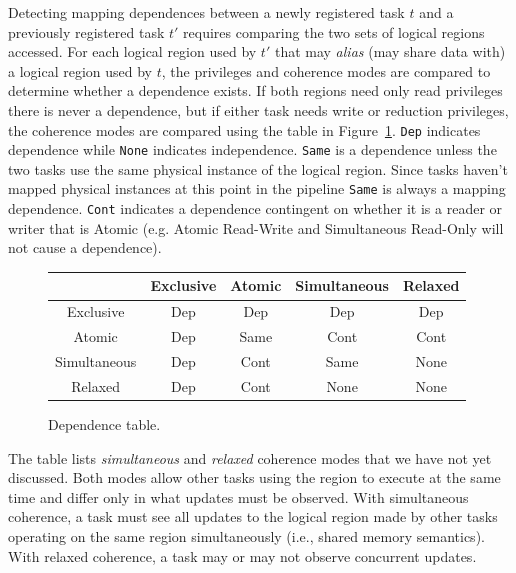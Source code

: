 Detecting mapping dependences between a newly registered task $t$ and
a previously registered task $t'$ requires comparing the two sets of
logical regions accessed.  For each logical region used by $t'$ that
may {\em alias} (may share data with) a logical region used by $t$, the privileges and
coherence modes are compared to determine whether a dependence exists.
If both regions need only read privileges there is never a dependence,
but if either task needs write or reduction privileges, the coherence
modes are compared using the table in Figure~\ref{fig:dependence}.
{\tt Dep} indicates dependence while {\tt None}
indicates independence.  {\tt Same} is a dependence unless the two tasks
use the same physical instance of the logical region.  Since tasks
haven't mapped physical instances at this point in the pipeline {\tt Same} is always
a mapping dependence.
{\tt Cont} 
indicates a dependence contingent on whether it is a reader or
writer that is Atomic (e.g. Atomic Read-Write and Simultaneous
Read-Only will not cause a dependence).


\begin{figure}
{\small
\begin{tabular}{c|cccc}
             & Exclusive & Atomic   & Simultaneous & Relaxed \\
\midrule
Exclusive    & Dep & Dep & Dep & Dep \\ 
Atomic       & Dep & Same & Cont & Cont \\
Simultaneous & Dep & Cont & Same & None \\
Relaxed      & Dep & Cont & None & None \\
\end{tabular}
}
\vspace{-2mm}
\caption{Dependence table. \label{fig:dependence}}
\vspace{-6mm}
\end{figure}

The table lists {\em simultaneous} and {\em relaxed} coherence modes
that we have not yet discussed.  Both modes
allow other tasks using the region to execute at the same time and differ
only in what updates must be observed.  With simultaneous coherence, a task must 
see all updates to the logical region made by other tasks operating on the same region 
simultaneously (i.e., shared memory semantics).  With relaxed coherence, 
a task may or may not observe concurrent updates.



